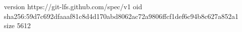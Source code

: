 version https://git-lfs.github.com/spec/v1
oid sha256:59d7c692dfaaaf81c8d4d170abd8062ac72a9806ffcf1def6c94b8c627a852a1
size 5612
